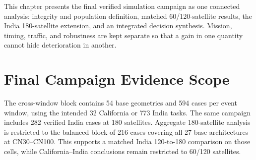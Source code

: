 This chapter presents the final verified simulation campaign as one connected analysis: integrity and population definition, matched 60/120-satellite results, the India 180-satellite extension, and an integrated decision synthesis. Mission, timing, traffic, and robustness are kept separate so that a gain in one quantity cannot hide deterioration in another.

\section{Final Campaign Evidence Scope}

The cross-window block contains 54 base geometries and 594 cases per event window, using the intended 32 California or 773 India tasks. The same campaign includes 282 verified India cases at 180 satellites. Aggregate 180-satellite analysis is restricted to the balanced block of 216 cases covering all 27 base architectures at CN30--CN100. This supports a matched India 120-to-180 comparison on those cells, while California--India conclusions remain restricted to 60/120 satellites.



